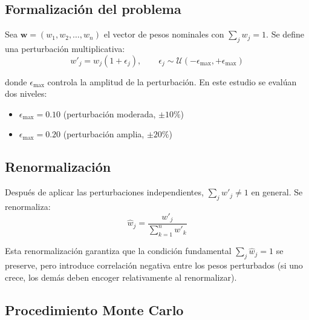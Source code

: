 \documentclass[12pt,a4paper,oneside]{book}
\begin{document}
\subsection{Formalización del problema}

Sea $\mathbf{w} = (w_1, w_2, \ldots, w_n)$ el vector de pesos nominales con $\sum_j w_j = 1$. Se define una perturbación multiplicativa:
\begin{equation}
w'_j = w_j (1 + \epsilon_j), \qquad \epsilon_j \sim \mathcal{U}(-\epsilon_{\max}, +\epsilon_{\max})
\label{doc6:eq:pertubation}
\end{equation}

donde $\epsilon_{\max}$ controla la amplitud de la perturbación. En este estudio se evalúan dos niveles:
\begin{itemize}
    \item $\epsilon_{\max} = 0.10$ (perturbación moderada, $\pm 10\%$)
    \item $\epsilon_{\max} = 0.20$ (perturbación amplia, $\pm 20\%$)
\end{itemize}

\subsection{Renormalización}

Después de aplicar las perturbaciones independientes, $\sum_j w'_j \neq 1$ en general. Se renormaliza:
\begin{equation}
\boxed{\hat{w}_j = \frac{w'_j}{\sum_{k=1}^{n} w'_k}}
\label{doc6:eq:renorm}
\end{equation}

Esta renormalización garantiza que la condición fundamental $\sum_j \hat{w}_j = 1$ se preserve, pero introduce correlación negativa entre los pesos perturbados (si uno crece, los demás deben encoger relativamente al renormalizar).

\subsection{Procedimiento Monte Carlo}
\end{document}
